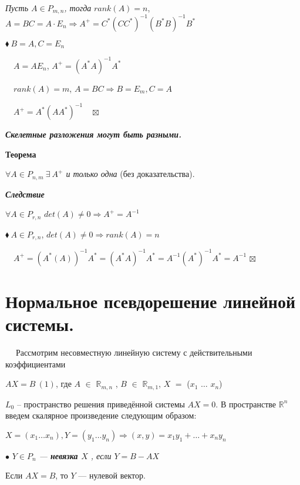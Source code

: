\documentclass[a4paper, 12pt]{report}
\begin{document}
	\textit{Пусть $A \in P_{m,n}$, тогда} $rank (A)=n$, $A=BC=A\cdot E_n \Rightarrow A^+ = C^*(CC^*)^{-1}(B^*B)^{-1}B^*$
	\par\bigskip
	$\blacklozenge\ B=A, C = E_n$
	
	$\quad A=AE_n$, $ A^+ = (A^*A)^{-1}A^*$
	
	$\quad rank(A)=m$, $A=BC \Rightarrow B = E_m, C=A$
	
	$\quad A^+=A^*(AA^*)^{-1} \quad\boxtimes$
	\par\bigskip
	\textbf{\textit{Скелетные разложения могут быть разными.}}
	\par\bigskip
	\textbf{Теорема}
	
	\textit{$\forall A \in P_{n,m}\ \exists\ A^+$ и только одна }(без доказательства).
	\par\bigskip
	\textit{\textbf{Следствие}}
	
	$\forall A \in P_{r, n}$ $det(A) \neq 0 \Rightarrow A^+=A^{-1}$
	\par\bigskip
	$\blacklozenge\ A \in P_{r,n}$, $det(A) \neq 0 \Rightarrow rank (A) = n$
	
	$\quad A^+ = (A^*(A))^{-1}A^*=(A^*A)^{-1}A^*=A^{-1}(A^*)^{-1}A^*=A^{-1}$
	$\boxtimes$
	
	
	
	
	
	
	
	
	
	
	\section{Нормальное псевдорешение линейной системы.}
	
	$\quad \; $Рассмотрим несовместную линейную систему с действительными коэффициентами 
	
	$AX = B\ (1)$, где $A$ $\in$ $\mathbb{R}_{m,n}$ , $B$ $\in$ $\mathbb{R}_{m,1}$, $X$ $=$ ($x_1$ $\dots$ $x_n$)
	
	$L_0$ – пространство решения приведённой системы $AX =  0$. В пространстве $\mathbb{R}^n$ введем скалярное произведение следующим образом:
	
	\par\bigskip
	
	\textit{$X = (x_1 \dots x_n), Y = (y_1 \dots y_n) \Rightarrow (x, y) = x_1y_1 + \dots + x_ny_n$}
	\par\bigskip
	
	$\bullet$\textit{ $Y \in P_n $ --- \textbf{ невязка $X$ }, если $Y = B - AX$}
	
	Если $AX = B$, то $Y$ --- нулевой вектор.
	
\end{document}
